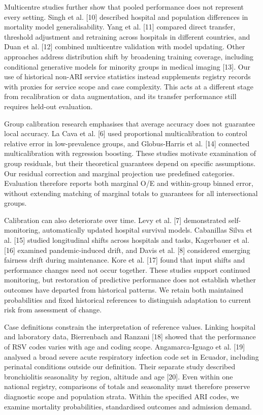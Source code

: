 \documentclass[11pt,a4paper]{article}
\newcommand{\subheading}[1]{\par\needspace{3\baselineskip}\vspace{5pt}{\bfseries #1}\par\vspace{1pt}}
\begin{document}
Multicentre studies further show that pooled performance does not represent every setting. Singh et al. [10] described hospital and population differences in mortality model generalisability. Yang et al. [11] compared direct transfer, threshold adjustment and retraining across hospitals in different countries, and Duan et al. [12] combined multicentre validation with model updating. Other approaches address distribution shift by broadening training coverage, including conditional generative models for minority groups in medical imaging [13]. Our use of historical non-ARI service statistics instead supplements registry records with proxies for service scope and case complexity. This acts at a different stage from recalibration or data augmentation, and its transfer performance still requires held-out evaluation.

\subheading{2.2 Group calibration and long-term maintenance}
Group calibration research emphasises that average accuracy does not guarantee local accuracy. La Cava et al. [6] used proportional multicalibration to control relative error in low-prevalence groups, and Globus-Harris et al. [14] connected multicalibration with regression boosting. These studies motivate examination of group residuals, but their theoretical guarantees depend on specific assumptions. Our residual correction and marginal projection use predefined categories. Evaluation therefore reports both marginal O/E and within-group binned error, without extending matching of marginal totals to guarantees for all intersectional groups.

Calibration can also deteriorate over time. Levy et al. [7] demonstrated self-monitoring, automatically updated hospital survival models. Cabanillas Silva et al. [15] studied longitudinal shifts across hospitals and tasks, Kagerbauer et al. [16] examined pandemic-induced drift, and Davis et al. [8] considered emerging fairness drift during maintenance. Kore et al. [17] found that input shifts and performance changes need not occur together. These studies support continued monitoring, but restoration of predictive performance does not establish whether outcomes have departed from historical patterns. We retain both maintained probabilities and fixed historical references to distinguish adaptation to current risk from assessment of change.

\clearpage
\subheading{2.3 Respiratory registries, hospital demand and paediatric recovery}
Case definitions constrain the interpretation of reference values. Linking hospital and laboratory data, Bierrenbach and Ranzani [18] showed that the performance of RSV codes varies with age and coding scope. Angamarca-Iguago et al. [19] analysed a broad severe acute respiratory infection code set in Ecuador, including perinatal conditions outside our definition. Their separate study described bronchiolitis seasonality by region, altitude and age [20]. Even within one national registry, comparisons of totals and seasonality must therefore preserve diagnostic scope and population strata. Within the specified ARI codes, we examine mortality probabilities, standardised outcomes and admission demand.
\end{document}

